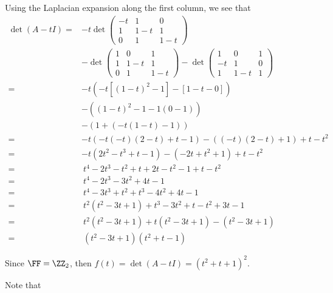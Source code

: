 \documentclass[11pt]{scrartcl}
\begin{document}
\begin{soln}
  Using the Laplacian expansion along the first column, we see that
  \begin{align}
\det(A-tI) =& -t \det
             \begin{pmatrix}
               -t & 1 & 0\\
               1 & 1-t & 1\\
               0 & 1 & 1-t
             \end{pmatrix}\\
                       &- \det
                       \begin{pmatrix}
                         1 & 0 & 1\\
                         1 & 1-t & 1\\
                         0 & 1 & 1-t
                       \end{pmatrix}- \det
                                 \begin{pmatrix}
                                   1 & 0 & 1\\
                                   -t & 1 & 0\\
                                   1 & 1-t & 1
                                 \end{pmatrix}\\
    =& -t \left( -t[(1-t)^2-1] - [1-t-0] \right)\\
            & - \left( (1-t)^2-1 -1(0-1)\right)\\
            &- \left( 1 + (-t(1-t)-1) \right)\\
    =& -t(-t(-t)(2-t) +t-1) -\left( (-t) (2-t) +1\right)+t-t^2\\
    =& -t(2t^2-t^3+t-1) -(-2t+t^2+1)+t-t^2\\
    =&\ t^4-2t^3-t^2+t+2t-t^2-1+t-t^2\\
    =&\ t^4-2t^3-3t^2+4t-1\\
    =&\ t^4-3t^3+t^2+t^3-4t^2+4t-1\\
    =&\ t^2(t^2-3t+1)+ t^3-3t^2+t -t^2+3t-1\\
    =&\ t^2(t^2-3t+1)+t(t^2-3t+1) - (t^2-3t+1)\\
    =&\ (t^2-3t+1)(t^2+t-1)
  \end{align}

  Since $\FF = \ZZ_2$, then $f(t) = \det(A-tI) = (t^2+t+1)^2$.

  Note that 


\end{soln}
\end{document}
